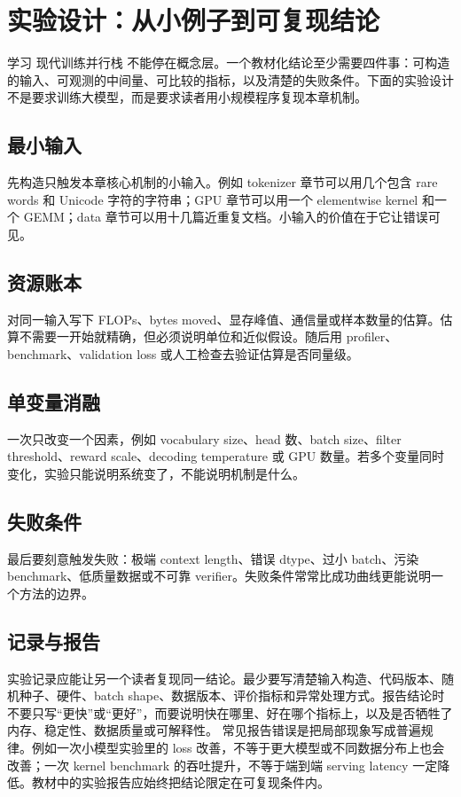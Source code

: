 \documentclass[a4paper]{article}
\begin{document}
\section{实验设计：从小例子到可复现结论}
学习 现代训练并行栈 不能停在概念层。一个教材化结论至少需要四件事：可构造的输入、可观测的中间量、可比较的指标，以及清楚的失败条件。下面的实验设计不是要求训练大模型，而是要求读者用小规模程序复现本章机制。
\subsection{最小输入}
先构造只触发本章核心机制的小输入。例如 tokenizer 章节可以用几个包含 rare words 和 Unicode 字符的字符串；GPU 章节可以用一个 elementwise kernel 和一个 GEMM；data 章节可以用十几篇近重复文档。小输入的价值在于它让错误可见。
\subsection{资源账本}
对同一输入写下 FLOPs、bytes moved、显存峰值、通信量或样本数量的估算。估算不需要一开始就精确，但必须说明单位和近似假设。随后用 profiler、benchmark、validation loss 或人工检查去验证估算是否同量级。
\subsection{单变量消融}
一次只改变一个因素，例如 vocabulary size、head 数、batch size、filter threshold、reward scale、decoding temperature 或 GPU 数量。若多个变量同时变化，实验只能说明系统变了，不能说明机制是什么。
\subsection{失败条件}
最后要刻意触发失败：极端 context length、错误 dtype、过小 batch、污染 benchmark、低质量数据或不可靠 verifier。失败条件常常比成功曲线更能说明一个方法的边界。
\subsection{记录与报告}
实验记录应能让另一个读者复现同一结论。最少要写清楚输入构造、代码版本、随机种子、硬件、batch shape、数据版本、评价指标和异常处理方式。报告结论时不要只写“更快”或“更好”，而要说明快在哪里、好在哪个指标上，以及是否牺牲了内存、稳定性、数据质量或可解释性。
常见报告错误是把局部现象写成普遍规律。例如一次小模型实验里的 loss 改善，不等于更大模型或不同数据分布上也会改善；一次 kernel benchmark 的吞吐提升，不等于端到端 serving latency 一定降低。教材中的实验报告应始终把结论限定在可复现条件内。
\end{document}
